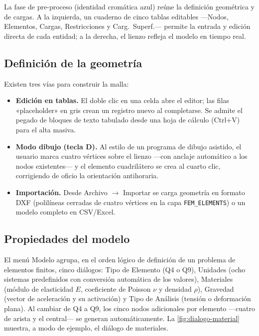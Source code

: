 La fase de pre-proceso (identidad cromática azul) reúne la definición geométrica y de cargas. A la izquierda, un cuaderno de cinco tablas editables ---\textsf{Nodos}, \textsf{Elementos}, \textsf{Cargas}, \textsf{Restricciones} y \textsf{Carg.\ Superf.}--- permite la entrada y edición directa de cada entidad; a la derecha, el lienzo refleja el modelo en tiempo real.

\subsection{Definición de la geometría}

Existen tres vías para construir la malla:

\begin{itemize}
  \item \textbf{Edición en tablas.} El doble clic en una celda abre el editor; las filas «placeholder» en gris crean un registro nuevo al completarse. Se admite el pegado de bloques de texto tabulado desde una hoja de cálculo (Ctrl+V) para el alta masiva.
  \item \textbf{Modo dibujo (tecla D).} Al estilo de un programa de dibujo asistido, el usuario marca cuatro vértices sobre el lienzo ---con anclaje automático a los nodos existentes--- y el elemento cuadrilátero se crea al cuarto clic, corrigiendo de oficio la orientación antihoraria.
  \item \textbf{Importación.} Desde \textsf{Archivo} $\rightarrow$ \textsf{Importar} se carga geometría en formato DXF (polilíneas cerradas de cuatro vértices en la capa \texttt{FEM\_ELEMENTS}) o un modelo completo en CSV/Excel.
\end{itemize}

\subsection{Propiedades del modelo}

El menú \textsf{Modelo} agrupa, en el orden lógico de definición de un problema de elementos finitos, cinco diálogos: \textsf{Tipo de Elemento} (Q4 o Q9), \textsf{Unidades} (ocho sistemas predefinidos con conversión automática de los valores), \textsf{Materiales} (módulo de elasticidad $E$, coeficiente de Poisson $\nu$ y densidad $\rho$), \textsf{Gravedad} (vector de aceleración y su activación) y \textsf{Tipo de Análisis} (tensión o deformación plana). Al cambiar de Q4 a Q9, los cinco nodos adicionales por elemento ---cuatro de arista y el central--- se generan automáticamente. La \autoref{fig:dialogo-material} muestra, a modo de ejemplo, el diálogo de materiales.

